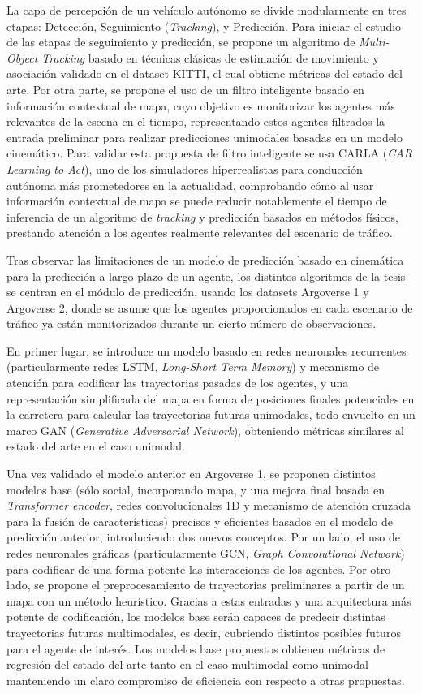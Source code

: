 La capa de percepción de un vehículo autónomo se divide modularmente en tres etapas: Detección, Seguimiento (\textit{Tracking}), y Predicción. Para iniciar el estudio de las etapas de seguimiento y predicción, se propone un algoritmo de \textit{Multi-Object Tracking} basado en técnicas clásicas de estimación de movimiento y asociación validado en el dataset KITTI, el cual obtiene métricas del estado del arte. Por otra parte, se propone el uso de un filtro inteligente basado en información contextual de mapa, cuyo objetivo es monitorizar los agentes más relevantes de la escena en el tiempo, representando estos agentes filtrados la entrada preliminar para realizar predicciones unimodales basadas en un modelo cinemático. Para validar esta propuesta de filtro inteligente se usa CARLA (\textit{CAR Learning to Act}), uno de los simuladores hiperrealistas para conducción autónoma más prometedores en la actualidad, comprobando cómo al usar información contextual de mapa se puede reducir notablemente el tiempo de inferencia de un algoritmo de \textit{tracking} y predicción basados en métodos físicos, prestando atención a los agentes realmente relevantes del escenario de tráfico.

Tras observar las limitaciones de un modelo de predicción basado en cinemática para la predicción a largo plazo de un agente, los distintos algoritmos de la tesis se centran en el módulo de predicción, usando los datasets Argoverse 1 y Argoverse 2, donde se asume que los agentes proporcionados en cada escenario de tráfico ya están monitorizados durante un cierto número de observaciones. 

En primer lugar, se introduce un modelo basado en redes neuronales recurrentes (particularmente redes LSTM, \textit{Long-Short Term Memory}) y mecanismo de atención para codificar las trayectorias pasadas de los agentes, y una representación simplificada del mapa en forma de posiciones finales potenciales en la carretera para calcular las trayectorias futuras unimodales, todo envuelto en un marco GAN (\textit{Generative Adversarial Network}), obteniendo métricas similares al estado del arte en el caso unimodal.

Una vez validado el modelo anterior en Argoverse 1, se proponen distintos modelos base (sólo social, incorporando mapa, y una mejora final basada en \textit{Transformer encoder}, redes convolucionales 1D y mecanismo de atención cruzada para la fusión de características) precisos y eficientes basados en el modelo de predicción anterior, introduciendo dos nuevos conceptos. Por un lado, el uso de redes neuronales gráficas (particularmente GCN, \textit{Graph Convolutional Network}) para codificar de una forma potente las interacciones de los agentes. Por otro lado, se propone el preprocesamiento de trayectorias preliminares a partir de un mapa con un método heurístico. Gracias a estas entradas y una arquitectura más potente de codificación, los modelos base serán capaces de predecir distintas trayectorias futuras multimodales, es decir, cubriendo distintos posibles futuros para el agente de interés. Los modelos base propuestos obtienen métricas de regresión del estado del arte tanto en el caso multimodal como unimodal manteniendo un claro compromiso de eficiencia con respecto a otras propuestas.

